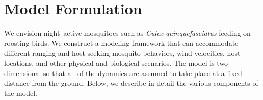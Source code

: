 \documentclass[12pt]{article}
\newif\ifcommentsw
\newcommand{\comment}[1]{\ifcommentsw  $\blacktriangleright$\ \textbf{#1}\ $\blacktriangleleft$ \fi}
\begin{document}
\section{Model Formulation}


We envision night--active mosquitoes such as \textsl{Culex quinquefasciatus} feeding on roosting birds.   We construct a modeling framework that can accommodate different ranging and host-seeking mosquito behaviors, wind velocities, host locations, and other physical and biological scenarios.  The model is two-dimensional so that all of the dynamics are assumed to take place at a fixed distance from the ground.
Below, we describe in detail the various components of the model.










\end{document}
